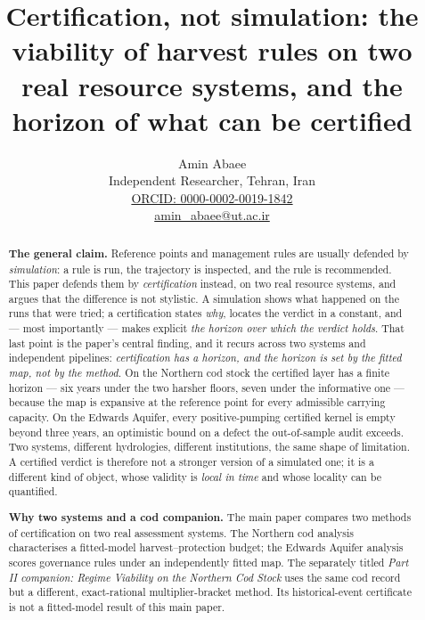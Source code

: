\title{Certification, not simulation: the viability of harvest rules on two real resource systems, and the horizon of what can be certified}
\author{Amin Abaee\\[0.35em]
{\small Independent Researcher, Tehran, Iran}\\[0.55em]
{\small\href{https://orcid.org/0000-0002-0019-1842}{ORCID: 0000-0002-0019-1842}}\\[0.3em]
{\small\href{mailto:amin\_abaee@ut.ac.ir}{amin\_abaee@ut.ac.ir}}}
\date{}
\maketitle
\begin{abstract}
\noindent\textbf{The general claim.} Reference points and management rules are usually defended by
\emph{simulation}: a rule is run, the trajectory is inspected, and the rule is recommended. This
paper defends them by \emph{certification} instead, on two real resource systems, and argues that
the difference is not stylistic. A simulation shows what happened on the runs that were tried; a
certification states \emph{why}, locates the verdict in a constant, and --- most importantly ---
makes explicit \emph{the horizon over which the verdict holds}. That last point is the paper's
central finding, and it recurs across two systems and independent pipelines: \emph{certification has
a horizon, and the horizon is set by the fitted map, not by the method.} On the Northern cod stock
the certified layer has a finite horizon --- six years under the two harsher floors, seven under the
informative one --- because the map is expansive at the reference point for every admissible carrying
capacity. On the Edwards Aquifer, every positive-pumping certified kernel is empty beyond three
years, an optimistic bound on a defect the out-of-sample audit exceeds. Two systems, different
hydrologies, different institutions, the same shape of limitation. A certified verdict is therefore
not a stronger version of a simulated one; it is a different kind of object, whose validity is
\emph{local in time} and whose locality can be quantified.

\noindent\textbf{Why two systems and a cod companion.} The main paper compares two
methods of certification on two real assessment systems. The Northern cod analysis
characterises a fitted-model harvest--protection budget; the Edwards Aquifer analysis
scores governance rules under an independently fitted map. The separately titled
\emph{Part II companion: Regime Viability on the Northern Cod Stock} uses the
same cod record but a different, exact-rational multiplier-bracket method. Its
historical-event certificate is not a fitted-model result of this main paper.


\end{abstract}
